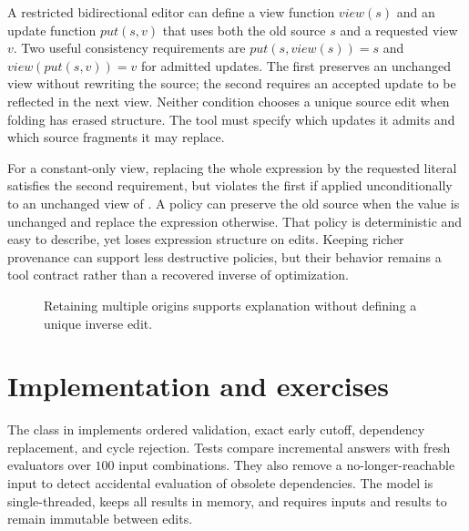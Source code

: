 A restricted bidirectional editor can define a view function $view(s)$ and an update function $put(s,v)$ that uses both the old source $s$ and a requested view $v$.
Two useful consistency requirements are $put(s,view(s))=s$ and $view(put(s,v))=v$ for admitted updates.
The first preserves an unchanged view without rewriting the source; the second requires an accepted update to be reflected in the next view.
Neither condition chooses a unique source edit when folding has erased structure.
The tool must specify which updates it admits and which source fragments it may replace.

For a constant-only view, replacing the whole expression by the requested literal satisfies the second requirement, but violates the first if applied unconditionally to an unchanged view of .
A policy can preserve the old source when the value is unchanged and replace the expression otherwise.
That policy is deterministic and easy to describe, yet loses expression structure on edits.
Keeping richer provenance can support less destructive policies, but their behavior remains a tool contract rather than a recovered inverse of optimization.

\begin{figure}[htbp]
\centering
{}
\caption{Retaining multiple origins supports explanation without defining a unique inverse edit.}
\label{fig:ch61-provenance}
\end{figure}

\section{Implementation and exercises}
\label{sec:ch61-exercises}

The  class in  implements ordered validation, exact early cutoff, dependency replacement, and cycle rejection.
Tests compare incremental answers with fresh evaluators over $100$ input combinations.
They also remove a no-longer-reachable input to detect accidental evaluation of obsolete dependencies.
The model is single-threaded, keeps all results in memory, and requires inputs and results to remain immutable between edits.

